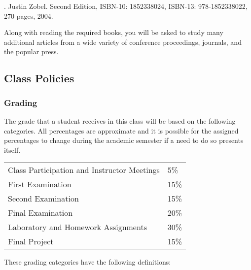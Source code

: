 .  Justin Zobel. Second Edition,  ISBN-10: 1852338024, ISBN-13:
978-1852338022, 270 pages, 2004.

\noindent
Along with reading the required books, you will be asked to study many additional articles from a wide variety of
conference proceedings, journals, and the popular press.

\subsection*{Class Policies}

\subsubsection*{Grading}

The grade that a student receives in this class will be based on the
following categories. All percentages are approximate and it is possible
for the assigned percentages to change during the academic semester if a
need to do so presents itself. 

\begin{center}
\begin{tabular}{ll}
Class Participation and Instructor Meetings & 5\% \\
First Examination & 15\% \\
Second Examination & 15\% \\
Final Examination & 20\% \\
Laboratory and Homework Assignments & 30\% \\
Final Project & 15\%
\end{tabular}
\end{center}

\vspace*{-.1in}
\noindent
These grading categories have the following definitions:
\vspace*{-.1in}


